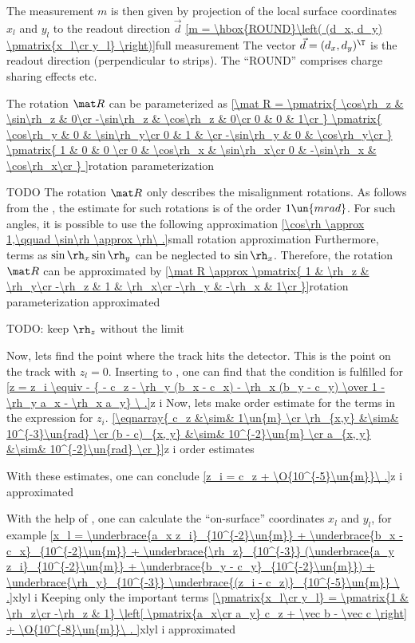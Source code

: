 The measurement $m$ is then given by projection of the local surface coordinates $x_l$ and $y_l$ to the readout direction $\vec d$
\eqref{m = \hbox{ROUND}\left( (d_x, d_y) \pmatrix{x_l\cr y_l} \right)}{full measurement}
The vector $\vec d = (d_x, d_y)^\T$ is the readout direction (perpendicular to strips). The ``ROUND'' comprises charge sharing effects etc.

The rotation $\mat R$ can be parameterized as
\eqref{\mat R =
\pmatrix{
\cos\rh_z  & \sin\rh_z & 0\cr
-\sin\rh_z & \cos\rh_z & 0\cr
0		   & 0         & 1\cr
}
\pmatrix{
\cos\rh_y  & 0 & \sin\rh_y\cr
0		   & 1 &          \cr
-\sin\rh_y & 0 & \cos\rh_y\cr
}
\pmatrix{
1 & 0		   & 0        \cr
0 & \cos\rh_x  & \sin\rh_x\cr
0 & -\sin\rh_x & \cos\rh_x\cr
}
}{rotation parameterization}

TODO The rotation $\mat R$ only describes the misalignment rotations. As follows from the , the estimate for such rotations is of the order $1\un{mrad}$. For such angles, it is possible to use the following approximation
\eqref{\cos\rh \approx 1,\qquad \sin\rh \approx \rh\ .}{small rotation approximation}
Furthermore, terms as $\sin\rh_x \sin\rh_y$ can be neglected to $\sin\rh_x$. Therefore, the rotation $\mat R$ can be approximated by
\eqref{\mat R \approx \pmatrix{
1 & \rh_z & \rh_y\cr
-\rh_z & 1 & \rh_x\cr
-\rh_y & -\rh_x & 1\cr
}}{rotation parameterization approximated}

TODO: keep $\rh_z$ without the limit

Now, lets find the point where the track  hits the detector. This is the point on the track with $z_l = 0$. Inserting  to , one can find that the condition is fulfilled for 
\eqref{z = z_i \equiv - { - c_z - \rh_y (b_x - c_x) - \rh_x (b_y - c_y) \over 1 - \rh_y a_x - \rh_x a_y} \ .}{z i}
Now, lets make order estimate for the terms in the expression for $z_i$.\hfil\break
\eqref{\eqnarray{
c_z &\sim& 1\un{m} \cr
\rh_{x,y} &\sim& 10^{-3}\un{rad} \cr
(b - c)_{x, y} &\sim& 10^{-2}\un{m} \cr
a_{x, y} &\sim& 10^{-2}\un{rad} \cr
}}{z i order estimates}

With these estimates, one can conclude
\eqref{z_i = c_z + \O{10^{-5}\un{m}}\ .}{z i approximated}

With the help of , one can calculate the ``on-surface'' coordinates $x_l$ and $y_l$, for example
\eqref{x_l = 
\underbrace{a_x z_i}_{10^{-2}\un{m}}
+ \underbrace{b_x - c_x}_{10^{-2}\un{m}} 
+ \underbrace{\rh_z}_{10^{-3}} (\underbrace{a_y z_i}_{10^{-2}\un{m}} + \underbrace{b_y - c_y}_{10^{-2}\un{m}})
+ \underbrace{\rh_y}_{10^{-3}} \underbrace{(z_i - c_z)}_{10^{-5}\un{m}}
\ .}{xlyl i}
Keeping only the important terms
\eqref{\pmatrix{x_l\cr y_l} = \pmatrix{1 & \rh_z\cr -\rh_z & 1}
\left[
\pmatrix{a_x\cr a_y} c_z + \vec b - \vec c
\right] + \O{10^{-8}\un{m}}\ .
}{xlyl i approximated}


